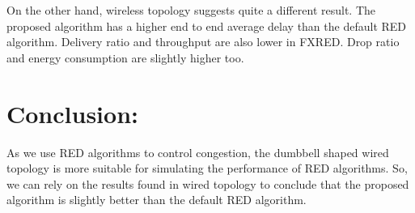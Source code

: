\documentclass[10pt]{report}
\begin{document}
On the other hand, wireless topology suggests quite a different result. The proposed algorithm has a higher end to end average delay than the default RED algorithm. Delivery ratio and throughput are also lower in FXRED. Drop ratio and energy consumption are slightly higher too.

\section*{Conclusion:}
As we use RED algorithms to control congestion, the dumbbell shaped wired topology is more suitable for simulating the performance of RED algorithms. So, we can rely on the results found in wired topology to conclude that the proposed algorithm is slightly better than the default RED algorithm.



\end{document}
